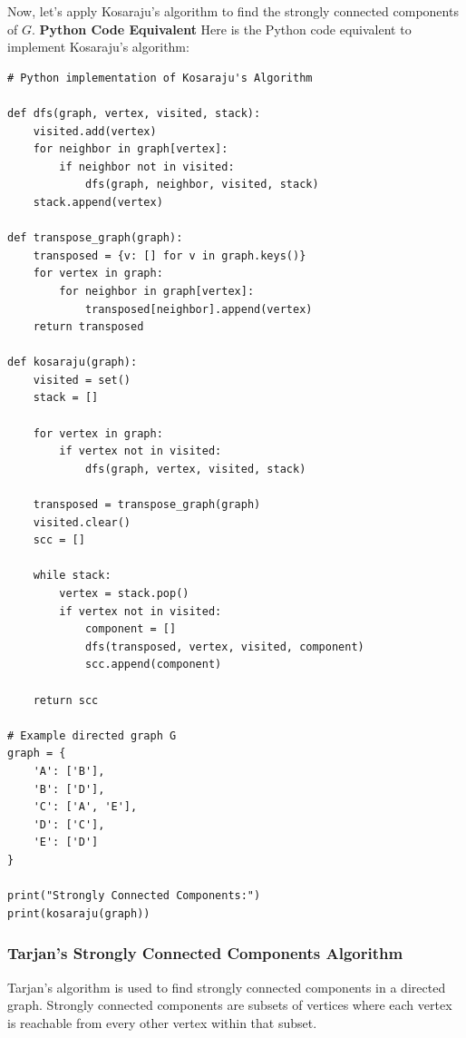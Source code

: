 \documentclass[12pt]{book} %
\begin{document}
Now, let's apply Kosaraju's algorithm to find the strongly connected components of $G$.
\FloatBarrier
\textbf{Python Code Equivalent}
\FloatBarrier
Here is the Python code equivalent to implement Kosaraju's algorithm:
\FloatBarrier
\begin{lstlisting}
# Python implementation of Kosaraju's Algorithm

def dfs(graph, vertex, visited, stack):
    visited.add(vertex)
    for neighbor in graph[vertex]:
        if neighbor not in visited:
            dfs(graph, neighbor, visited, stack)
    stack.append(vertex)

def transpose_graph(graph):
    transposed = {v: [] for v in graph.keys()}
    for vertex in graph:
        for neighbor in graph[vertex]:
            transposed[neighbor].append(vertex)
    return transposed

def kosaraju(graph):
    visited = set()
    stack = []

    for vertex in graph:
        if vertex not in visited:
            dfs(graph, vertex, visited, stack)

    transposed = transpose_graph(graph)
    visited.clear()
    scc = []

    while stack:
        vertex = stack.pop()
        if vertex not in visited:
            component = []
            dfs(transposed, vertex, visited, component)
            scc.append(component)

    return scc

# Example directed graph G
graph = {
    'A': ['B'],
    'B': ['D'],
    'C': ['A', 'E'],
    'D': ['C'],
    'E': ['D']
}

print("Strongly Connected Components:")
print(kosaraju(graph))
\end{lstlisting}
\FloatBarrier

\subsubsection{Tarjan's Strongly Connected Components Algorithm}
Tarjan's algorithm is used to find strongly connected components in a directed graph. Strongly connected components are subsets of vertices where each vertex is reachable from every other vertex within that subset.
\end{document}
